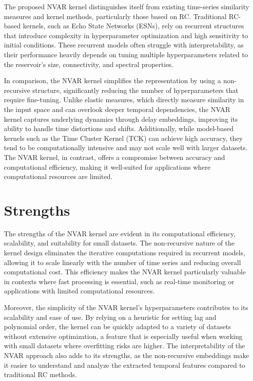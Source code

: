 The proposed NVAR kernel distinguishes itself from existing time-series similarity measures and kernel methods, particularly those based on RC. Traditional RC-based kernels, such as Echo State Networks (ESNs), rely on recurrent structures that introduce complexity in hyperparameter optimization and high sensitivity to initial conditions. These recurrent models often struggle with interpretability, as their performance heavily depends on tuning multiple hyperparameters related to the reservoir's size, connectivity, and spectral properties.

In comparison, the NVAR kernel simplifies the representation by using a non-recursive structure, significantly reducing the number of hyperparameters that require fine-tuning. Unlike elastic measures, which directly measure similarity in the input space and can overlook deeper temporal dependencies, the NVAR kernel captures underlying dynamics through delay embeddings, improving its ability to handle time distortions and shifts. Additionally, while model-based kernels such as the Time Cluster Kernel (TCK) can achieve high accuracy, they tend to be computationally intensive and may not scale well with larger datasets. The NVAR kernel, in contrast, offers a compromise between accuracy and computational efficiency, making it well-suited for applications where computational resources are limited.

\section{Strengths}

The strengths of the NVAR kernel are evident in its computational efficiency, scalability, and suitability for small datasets. The non-recursive nature of the kernel design eliminates the iterative computations required in recurrent models, allowing it to scale linearly with the number of time series and reducing overall computational cost. This efficiency makes the NVAR kernel particularly valuable in contexts where fast processing is essential, such as real-time monitoring or applications with limited computational resources.

Moreover, the simplicity of the NVAR kernel's hyperparameters contributes to its scalability and ease of use. By relying on a heuristic for setting lag and polynomial order, the kernel can be quickly adapted to a variety of datasets without extensive optimization, a feature that is especially useful when working with small datasets where overfitting risks are higher. The interpretability of the NVAR approach also adds to its strengths, as the non-recursive embeddings make it easier to understand and analyze the extracted temporal features compared to traditional RC methods.

